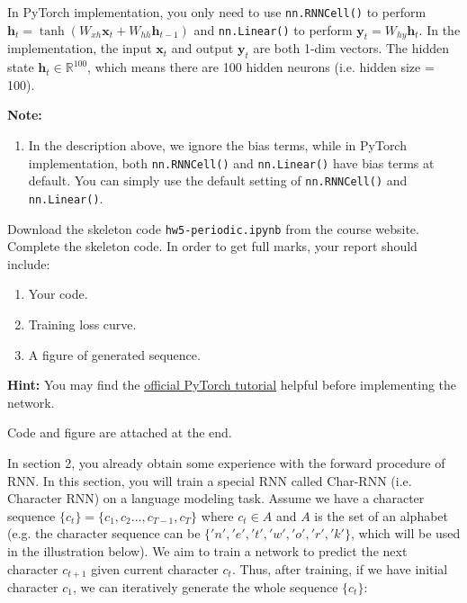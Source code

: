 \documentclass{article}
\newcommand{\R}{\mathbb{R}}
\newcommand{\x}{\mathbf{x}}
\newcommand{\h}{\mathbf{h}}
\newcommand{\y}{\mathbf{y}}
\begin{document}
\begin{probset}
\begin{prob}
    In PyTorch implementation, you only need to use \texttt{nn.RNNCell()} to perform $\h_t = \tanh(W_{xh} \x_t + W_{hh} \h_{t-1})$ and \texttt{nn.Linear()} to perform $\y_t = W_{hy} \h_t$. In the implementation, the input $\x_t$ and output $\y_t$ are both 1-dim vectors. The hidden state $\h_t \in \R^{100}$, which means there are 100 hidden neurons (i.e. hidden size = 100).

    \textbf{Note:}
    \begin{enumerate}
        \item In the description above, we ignore the bias terms, while in PyTorch implementation, both \newline\texttt{nn.RNNCell()} and \texttt{nn.Linear()} have bias terms at default. You can simply use the default setting of \texttt{nn.RNNCell()} and \texttt{nn.Linear()}.
    \end{enumerate}

    Download the skeleton code \texttt{hw5-periodic.ipynb} from the course website. Complete the skeleton code. In order to get full marks, your report should include:

    \begin{enumerate}
        \item Your code.
        \item Training loss curve.
        \item A figure of generated sequence.
    \end{enumerate}

    \textbf{Hint:} You may find the \href{https://pytorch.org/tutorials/beginner/deep_learning_60min_blitz.html}{official PyTorch tutorial} helpful before implementing the network.

    \begin{soln}
        Code and figure are attached at the end.
    \end{soln}
\end{prob}

\newpage

\begin{prob}
    In section 2, you already obtain some experience with the forward procedure of RNN. In this section, you will train a special RNN called Char-RNN (i.e. Character RNN) on a language modeling task. Assume we have a character sequence $\{c_t\} = \{c_1, c_2..., c_{T - 1}, c_T \}$ where $c_t \in A$ and $A$ is the set of an alphabet (e.g. the character sequence can be $\{'n', 'e', 't', 'w', 'o', 'r', 'k'\}$, which will be used in the illustration below). We aim to train a network to predict the next character $c_{t+1}$ given current character $c_t$. Thus, after training, if we have initial character $c_1$, we can iteratively generate the whole sequence $\{c_t\}$:


\end{prob}
\end{probset}
\end{document}
